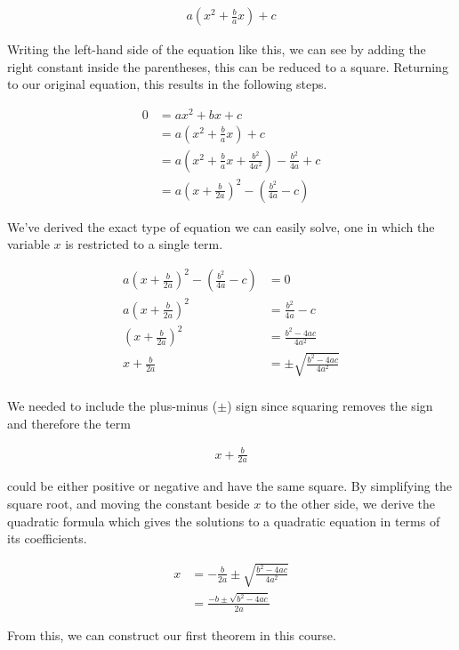 \documentclass[twoside]{report}
\begin{document}
\begin{align*}
	a \left( x^2 + \frac{b}{a}x \right) + c
\end{align*}

Writing the left-hand side of the equation like this, we can see by adding the right constant inside the parentheses, this can be reduced to a square. Returning to our original equation, this results in the following steps.

\begin{align*}
	0 &= ax^2 + bx + c \\
	&= a \left( x^2 + \frac{b}{a}x \right) + c \\
	&= a \left( x^2 + \frac{b}{a}x + \frac{b^2}{4a^2} \right) - \frac{b^2}{4a} + c \\
	&= a \left( x + \frac{b}{2a} \right)^2 - \left(\frac{b^2}{4a} - c \right)
\end{align*}

We've derived the exact type of equation we can easily solve, one in which the variable $x$ is restricted to a single term.

\begin{align*}
	a \left( x + \frac{b}{2a} \right)^2 - \left( \frac{b^2}{4a} -c \right) &= 0 \\
	a \left( x + \frac{b}{2a} \right)^2 &= \frac{b^2}{4a} - c \\
	\left( x + \frac{b}{2a} \right)^2 &= \frac{b^2 - 4ac}{4a^2} \\
	x + \frac{b}{2a} &= \pm \sqrt{\frac{b^2 - 4ac}{4a^2}} \\
\end{align*}

We needed to include the plus-minus ($\pm$) sign since squaring removes the sign and therefore the term

\begin{align*}
	x + \frac{b}{2a}
\end{align*}

could be either positive or negative and have the same square. By simplifying the square root, and moving the constant beside $x$ to the other side, we derive the quadratic formula which gives the solutions to a quadratic equation in terms of its coefficients.

\begin{align}
	x &= - \frac{b}{2a} \pm \sqrt{\frac{b^2 - 4ac}{4a^2}} \\ 
	&= \frac{-b \pm \sqrt{b^2 - 4ac}}{2a}
\end{align}

From this, we can construct our first theorem in this course.
\end{document}
